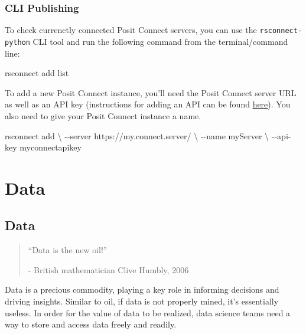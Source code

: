 \documentclass[
  letterpaper,
  DIV=11,
  numbers=noendperiod]{scrreprt}
\newenvironment{Shaded}{\begin{snugshade}}{\end{snugshade}}
\newcommand{\AttributeTok}[1]{\textcolor[rgb]{0.40,0.45,0.13}{#1}}
\newcommand{\DataTypeTok}[1]{\textcolor[rgb]{0.68,0.00,0.00}{#1}}
\newcommand{\ExtensionTok}[1]{\textcolor[rgb]{0.00,0.23,0.31}{#1}}
\newcommand{\NormalTok}[1]{\textcolor[rgb]{0.00,0.23,0.31}{#1}}
\begin{document}
\section{CLI Publishing}\label{cli-publishing}

To check currenctly connected Posit Connect servers, you can use the
\texttt{rsconnect-python} CLI tool and run the following command from
the terminal/command line:

\begin{Shaded}
\begin{Highlighting}[]
\ExtensionTok{rsconnect}\NormalTok{ add list }
\end{Highlighting}
\end{Shaded}

To add a new Posit Connect instance, you'll need the Posit Connect
server URL as well as an API key (instructions for adding an API can be
found \href{https://docs.posit.co/connect/user/api-keys/}{here}). You
also need to give your Posit Connect instance a name.

\begin{Shaded}
\begin{Highlighting}[]
\ExtensionTok{rsconnect}\NormalTok{ add }\DataTypeTok{\textbackslash{}}
    \AttributeTok{{-}{-}server}\NormalTok{ https://my.connect.server/ }\DataTypeTok{\textbackslash{}}
    \AttributeTok{{-}{-}name}\NormalTok{ myServer }\DataTypeTok{\textbackslash{}}
    \AttributeTok{{-}{-}api{-}key}\NormalTok{ myconnectapikey}
\end{Highlighting}
\end{Shaded}

\part{Data}

\chapter{Data}\label{data-1}

\begin{quote}
{``Data is the new oil!''}

- British mathematician Clive Humbly, 2006
\end{quote}

Data is a precious commodity, playing a key role in informing decisions
and driving insights. Similar to oil, if data is not properly mined,
it's essentially useless. In order for the value of data to be realized,
data science teams need a way to store and access data freely and
readily.
\end{document}

